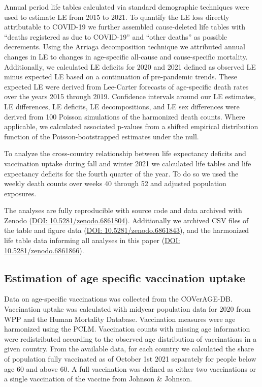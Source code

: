 \documentclass[12pt]{article}
\begin{document}
Annual period life tables calculated via standard demographic techniques\cite{Chiang1979} were used to estimate LE from 2015 to 2021. To quantify the LE loss directly attributable to COVID-19 we further assembled cause-deleted life tables with ``deaths registered as due to COVID-19'' and ``other deaths'' as possible decrements.\cite{Preston2001} Using the Arriaga decomposition technique\cite{Arriaga1984} we attributed annual changes in LE to changes in age-specific all-cause and cause-specific mortality. Additionally, we calculated LE deficits for 2020 and 2021 defined as observed LE minus expected LE based on a continuation of pre-pandemic trends. These expected LE were derived from Lee-Carter forecasts\cite{Lee1992} of age-specific death rates over the years 2015 through 2019.
Confidence intervals around our LE estimates, LE differences, LE deficits, LE decompositions, and LE sex differences were derived from 100 Poisson simulations of the harmonized death counts. Where applicable, we calculated associated p-values from a shifted empirical distribution function of the Poisson-bootstrapped estimates under the null.

To analyze the cross-country relationship between life expectancy deficits and vaccination uptake during fall and winter 2021 we calculated life tables and life expectancy deficits for the fourth quarter of the year. To do so we used the weekly death counts over weeks 40 through 52 and adjusted population exposures.

The analyses are fully reproducible with source code and data archived with Zenodo (\href{https://zenodo.org/record/6861804}{DOI: 10.5281/zenodo.6861804}). Additionally we archived CSV files of the table and figure data (\href{https://zenodo.org/record/6861843}{DOI: 10.5281/zenodo.6861843}), and the harmonized life table data informing all analyses in this paper (\href{https://zenodo.org/record/6861866}{DOI: 10.5281/zenodo.6861866}).

\subsection*{Estimation of age specific vaccination uptake}

Data on age-specific vaccinations was collected from the COVerAGE-DB.\cite{Riffe2021} Vaccination uptake was calculated with midyear population data for 2020 from WPP\cite{UnitedNations2021} and the Human Mortality Database. Vaccination measures were age harmonized using the PCLM. Vaccination counts with missing age information were redistributed according to the observed age distribution of vaccinations in a given country. From the available data, for each country we calculated the share of population fully vaccinated as of October 1st 2021 separately for people below age 60 and above 60. A full vaccination was defined as either two vaccinations or a single vaccination of the vaccine from Johnson \& Johnson.
\end{document}
